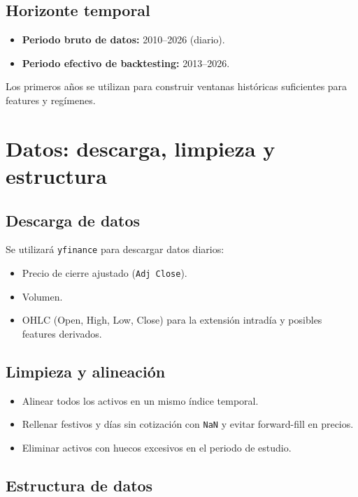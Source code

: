 \documentclass[12pt]{article}
\begin{document}
\subsection{Horizonte temporal}

\begin{itemize}
    \item \textbf{Periodo bruto de datos:} 2010--2026 (diario).
    \item \textbf{Periodo efectivo de backtesting:} 2013--2026.
\end{itemize}

Los primeros años se utilizan para construir ventanas históricas suficientes para features y regímenes.

\section{Datos: descarga, limpieza y estructura}

\subsection{Descarga de datos}

Se utilizará \texttt{yfinance} para descargar datos diarios:

\begin{itemize}
    \item Precio de cierre ajustado (\texttt{Adj Close}).
    \item Volumen.
    \item OHLC (Open, High, Low, Close) para la extensión intradía y posibles features derivados.
\end{itemize}

\subsection{Limpieza y alineación}

\begin{itemize}
    \item Alinear todos los activos en un mismo índice temporal.
    \item Rellenar festivos y días sin cotización con \texttt{NaN} y evitar forward-fill en precios.
    \item Eliminar activos con huecos excesivos en el periodo de estudio.
\end{itemize}

\subsection{Estructura de datos}
\end{document}
